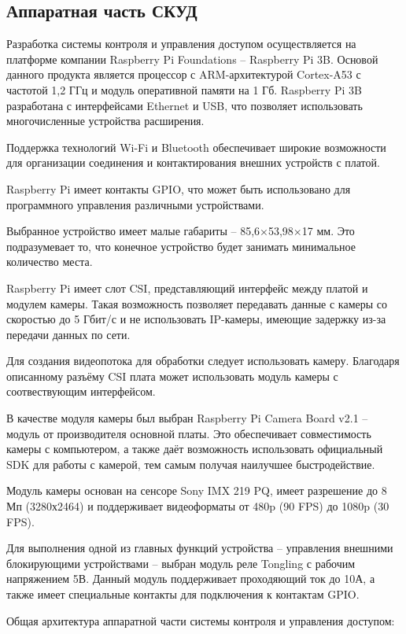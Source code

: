\subsection{Аппаратная часть СКУД}

Разработка системы контроля и управления доступом осуществляется на платформе компании Raspberry Pi Foundations -- Raspberry Pi 3B. Основой данного продукта является процессор с ARM-архитектурой Cortex-A53 с частотой  1,2 ГГц и модуль оперативной памяти на 1 Гб. Raspberry Pi 3B разработана с интерфейсами Ethernet и USB, что позволяет использовать многочисленные устройства расширения. 

Поддержка технологий Wi-Fi и Bluetooth обеспечивает широкие возможности для организации соединения и контактирования внешних устройств с платой.

Raspberry Pi имеет контакты GPIO, что может быть использовано для программного управления различными устройствами.

Выбранное устройство имеет малые габариты -- 85,6×53,98×17 мм. Это подразумевает то, что конечное устройство будет занимать минимальное количество места. %


Raspberry Pi имеет слот CSI, представляющий интерфейс между платой и модулем камеры. Такая возможность позволяет передавать данные с камеры со скоростью до 5 Гбит/с и не использовать IP-камеры, имеющие задержку из-за передачи данных по сети.

Для создания видеопотока для обработки следует использовать камеру. Благодаря описанному разъёму CSI плата может использовать модуль камеры с соотвествующим интерфейсом.

В качестве модуля камеры был выбран Raspberry Pi Camera Board v2.1 -- модуль от производителя основной платы. Это обеспечивает совместимость камеры с компьютером, а также даёт возможность использовать официальный SDK для работы с камерой, тем самым получая наилучшее быстродействие.


Модуль камеры основан на сенсоре Sony IMX 219 PQ, имеет разрешение до 8 Мп (3280х2464) и поддерживает видеоформаты от 480p (90 FPS) до 1080p (30 FPS).

Для выполнения одной из главных функций устройства -- управления внешними блокирующими устройствами -- выбран модуль реле Tongling с рабочим напряжением 5В. Данный модуль поддерживает проходяющий ток до 10А, а также имеет специальные контакты для подключения к контактам GPIO.


Общая архитектура аппаратной части системы контроля и управления доступом:

